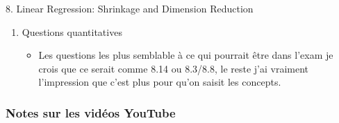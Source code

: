 \documentclass[12pt, titlepage, french]{report}
\begin{document}
\begin{CHPT_SUMM}{8. Linear Regression:  Shrinkage and Dimension Reduction}
\begin{enumerate}
\begin{itemize}
		\item	Bien saisir le lien avec le SSE et les différentes méthodes de régression;
		\item	Savoir et comprendre le lien entre le budget alloué $s$ et $\lambda$;
		\item	Savoir et comprendre la distinction entre PCA et PLS.
	\end{itemize}
	\item	Questions quantitatives
	\begin{itemize}
		\item	Les questions les plus semblable à ce qui pourrait être dans l'exam je crois que ce serait comme 8.14 ou 8.3/8.8, le reste j'ai vraiment l'impression que c'est plus pour qu'on saisit les concepts.
	\end{itemize}
\end{enumerate}
\end{CHPT_SUMM}

\subsubsection{Notes sur les vidéos YouTube}
\end{document}
